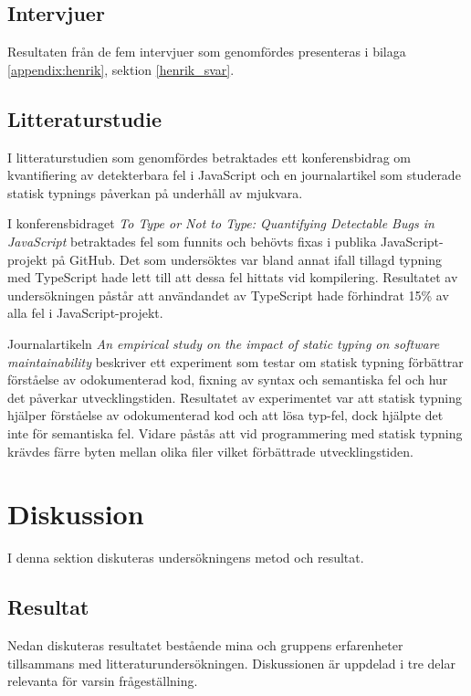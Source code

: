 \subsection{Intervjuer}
Resultaten från de fem intervjuer som genomfördes presenteras i bilaga \ref{appendix:henrik}, sektion \ref{henrik_svar}. 
\subsection{Litteraturstudie}
I litteraturstudien som genomfördes betraktades ett konferensbidrag om kvantifiering av detekterbara fel i JavaScript och en journalartikel som studerade statisk typnings påverkan på underhåll av mjukvara.

I konferensbidraget \textit{To Type or Not to Type:
Quantifying Detectable Bugs in JavaScript} \cite{henrik_totypeornot} betraktades fel som funnits och behövts fixas i publika JavaScript-projekt på GitHub. Det som undersöktes var bland annat ifall tillagd typning med TypeScript hade lett till att dessa fel hittats vid kompilering.
Resultatet av undersökningen påstår att användandet av TypeScript hade förhindrat 15\% av alla fel i JavaScript-projekt.

Journalartikeln \textit{An empirical study on the impact of static typing
on software maintainability} \cite{henrik_maintainability} beskriver ett experiment som testar om statisk typning förbättrar förståelse av odokumenterad kod, fixning av syntax och semantiska fel och hur det påverkar utvecklingstiden.
Resultatet av experimentet var att statisk typning hjälper förståelse av odokumenterad kod och att lösa typ-fel, dock hjälpte det inte för semantiska fel. Vidare påstås att vid programmering med statisk typning krävdes färre byten mellan olika filer vilket förbättrade utvecklingstiden.

\section{Diskussion}
I denna sektion diskuteras undersökningens metod och resultat.
\subsection{Resultat}
Nedan diskuteras resultatet bestående mina och gruppens erfarenheter tillsammans med litteraturundersökningen. Diskussionen är uppdelad i tre delar relevanta för varsin frågeställning.
